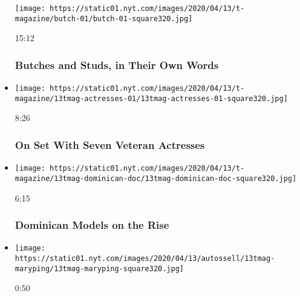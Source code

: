 \begin{itemize}
  \texttt{[image: https://static01.nyt.com/images/2020/04/13/t-magazine/butch-01/butch-01-square320.jpg]}

  15:12

  \hypertarget{butches-and-studs-in-their-own-words}{%
  \subsubsection{Butches and Studs, in Their Own
  Words}\label{butches-and-studs-in-their-own-words}}
\item
  \href{https://www.nytimes.com/video/t-magazine/entertainment/100000007077732/on-set-with-seven-veteran-actresses.html?action=click\&module=video-series-bar\&region=header\&pgtype=Article\&playlistId=video/t-magazine}{}

  \texttt{[image: https://static01.nyt.com/images/2020/04/13/t-magazine/13tmag-actresses-01/13tmag-actresses-01-square320.jpg]}

  8:26

  \hypertarget{on-set-with-seven-veteran-actresses}{%
  \subsubsection{On Set With Seven Veteran
  Actresses}\label{on-set-with-seven-veteran-actresses}}
\item
  \href{https://www.nytimes.com/video/t-magazine/100000007077728/dominican-models-on-the-rise.html?action=click\&module=video-series-bar\&region=header\&pgtype=Article\&playlistId=video/t-magazine}{}

  \texttt{[image: https://static01.nyt.com/images/2020/04/13/t-magazine/13tmag-dominican-doc/13tmag-dominican-doc-square320.jpg]}

  6:15

  \hypertarget{dominican-models-on-the-rise}{%
  \subsubsection{Dominican Models on the
  Rise}\label{dominican-models-on-the-rise}}
\item
  \href{https://www.nytimes.com/video/t-magazine/100000007066012/make-t-something-mary-ping.html?action=click\&module=video-series-bar\&region=header\&pgtype=Article\&playlistId=video/t-magazine}{}

  \texttt{[image: https://static01.nyt.com/images/2020/04/13/autossell/13tmag-maryping/13tmag-maryping-square320.jpg]}

  0:50


\end{itemize}
